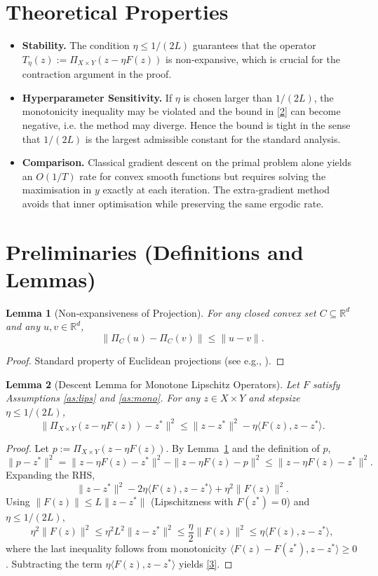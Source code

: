 \documentclass{article}
\newtheorem{lemma}{Lemma}
\newcommand{\proj}[2]{\Pi_{#1}\!\left(#2\right)}
\newcommand{\R}{\mathbb{R}}
\begin{document}
\section*{Theoretical Properties}
\begin{itemize}
\item \textbf{Stability.} The condition $\eta\le 1/(2L)$ guarantees that the operator
$T_{\eta}(z):=\proj{X\times Y}{z-\eta F(z)}$ is non‑expansive, which is crucial for the
contraction argument in the proof.
\item \textbf{Hyperparameter Sensitivity.} If $\eta$ is chosen larger than $1/(2L)$,
the monotonicity inequality may be violated and the bound in \eqref{2} can become
negative, i.e. the method may diverge. Hence the bound is tight in the sense
that $1/(2L)$ is the largest admissible constant for the standard analysis.
\item \textbf{Comparison.} Classical gradient descent on the primal problem alone
yields an $O(1/T)$ rate for convex smooth functions but requires solving the
maximisation in $y$ exactly at each iteration. The extra‑gradient method avoids
that inner optimisation while preserving the same ergodic rate.
\end{itemize}

\section*{Preliminaries (Definitions and Lemmas)}
\begin{lemma}[Non‑expansiveness of Projection]\label{lem:proj}
For any closed convex set $C\subseteq\R^{d}$ and any $u,v\in\R^{d}$,
\[
\|\proj{C}{u}-\proj{C}{v}\|\le\|u-v\|.
\]
\end{lemma}
\begin{proof}
Standard property of Euclidean projections (see e.g., \cite{Bauschke2011}).
\end{proof}

\begin{lemma}[Descent Lemma for Monotone Lipschitz Operators]\label{lem:descent}
Let $F$ satisfy Assumptions \ref{as:lips} and \ref{as:mono}. For any $z\in X\times Y$ and stepsize
$\eta\le 1/(2L)$,
\[
\| \proj{X\times Y}{z-\eta F(z)}-z^{*}\|^{2}
\le \|z-z^{*}\|^{2}-\eta\langle F(z),z-z^{*}\rangle .
\tag{3}
\]
\end{lemma}
\begin{proof}
Let $p:=\proj{X\times Y}{z-\eta F(z)}$. By Lemma~\ref{lem:proj} and the definition of $p$,
\[
\|p-z^{*}\|^{2}
= \|z-\eta F(z)-z^{*}\|^{2}
- \|z-\eta F(z)-p\|^{2}
\le \|z-\eta F(z)-z^{*}\|^{2}.
\]
Expanding the RHS,
\[
\|z-z^{*}\|^{2}-2\eta\langle F(z),z-z^{*}\rangle+\eta^{2}\|F(z)\|^{2}.
\]
Using $\|F(z)\|\le L\|z-z^{*}\|$ (Lipschitzness with $F(z^{*})=0$) and $\eta\le 1/(2L)$,
\[
\eta^{2}\|F(z)\|^{2}\le \eta^{2}L^{2}\|z-z^{*}\|^{2}\le \frac{\eta}{2}\|F(z)\|^{2}
\le \eta\langle F(z),z-z^{*}\rangle,
\]
where the last inequality follows from monotonicity $ \langle F(z)-F(z^{*}),z-z^{*}\rangle\ge0$.
Subtracting the term $\eta\langle F(z),z-z^{*}\rangle$ yields \eqref{3}.
\end{proof}
\end{document}
